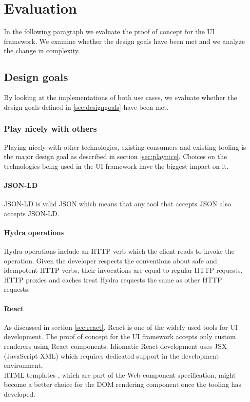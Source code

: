 \section{Evaluation}
In the following paragraph we evaluate the proof of concept for the UI framework. We examine whether the design goals have been met and we analyze the change in complexity.

\subsection{Design goals}
By looking at the implementations of both use cases, we evaluate whether the design goals defined in \ref{sec:designgoals} have been met.

\subsubsection{Play nicely with others}
Playing nicely with other technologies, existing consumers and existing tooling is the major design goal as described in section \ref{sec:playnice}. Choices on the technologies being used in the UI framework have the biggest impact on it.

\paragraph{JSON-LD}
JSON-LD is valid JSON which means that any tool that accepts JSON also accepts JSON-LD.

\paragraph{Hydra operations}
Hydra operations include an  HTTP verb which the client reads to invoke the operation. Given the developer respects the conventions about safe and idempotent HTTP verbs, their invocations are equal to regular HTTP requests. HTTP proxies and caches treat Hydra requests the same as other HTTP requests.

\paragraph{React}
As discussed in section \ref{sec:react}, React is one of the widely used tools for UI development. The proof of concept for the UI framework accepts only custom renderers using React components. Idiomatic React development uses JSX (JavaScript XML) which requires dedicated support in the development environment. \\
HTML templates \citep{htmltemplates}, which are part of the Web component specification, might become a better choice for the DOM rendering component once the tooling has developed.

